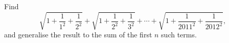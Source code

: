Find
\[
\sqrt{1+\dfrac{1}{1^2}+\dfrac{1}{2^2}}+\sqrt{1+\dfrac{1}{2^2}+\dfrac{1}{3^2}}+\cdots+\sqrt{1+\dfrac{1}{2011^2}+\dfrac{1}{2012^2}},
\]
and generalise the result to the sum of the first $n$ such terms.
